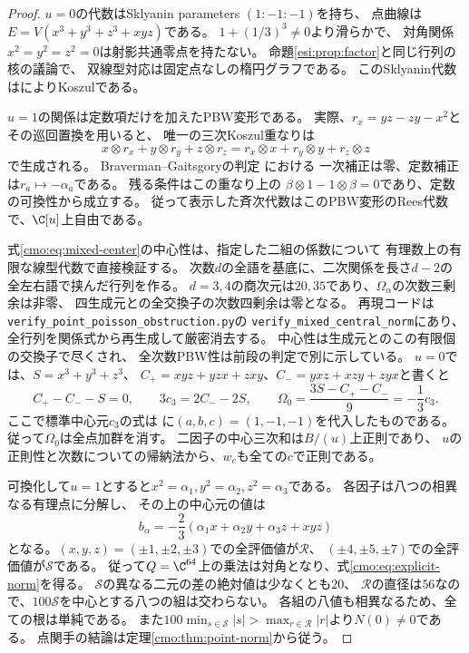 \begin{proof}
$u=0$の代数はSklyanin parameters $(1:-1:-1)$を持ち、
点曲線は$E=V(x^3+y^3+z^3+xyz)$である。
$1+(1/3)^3\ne0$より滑らかで、
対角関係$x^2=y^2=z^2=0$は射影共通零点を持たない。
命題\ref{esi:prop:factor}と同じ行列の核の議論で、
双線型対応は固定点なしの楕円グラフである。
このSklyanin代数は\cite[Theorem~1.1, Corollary~1.3]{GRSklyaninTV}によりKoszulである。

$u=1$の関係は定数項だけを加えたPBW変形である。
実際、$r_x=yz-zy-x^2$とその巡回置換を用いると、
唯一の三次Koszul重なりは
\[
 x\otimes r_x+y\otimes r_y+z\otimes r_z
   =r_x\otimes x+r_y\otimes y+r_z\otimes z
\]
で生成される。
Braverman--Gaitsgoryの判定
\cite[Main Theorem~0.5, Lemma~3.3]{CMOBravermanGaitsgory}における
一次補正は零、定数補正は$r_a\mapsto-\alpha_a$である。
残る条件はこの重なり上の
$\beta\otimes1-1\otimes\beta=0$であり、定数の可換性から成立する。
従って表示した斉次代数はこのPBW変形のRees代数で、$\C[u]$上自由である。

式\eqref{cmo:eq:mixed-center}の中心性は、指定した二組の係数について
有理数上の有限な線型代数で直接検証する。
次数$d$の全語を基底に、二次関係を長さ$d-2$の全左右語で挟んだ行列を作る。
$d=3,4$の商次元は$20,35$であり、$\Omega_\alpha$の次数三剰余は非零、
四生成元との全交換子の次数四剰余は零となる。
再現コードは\texttt{verify\_point\_poisson\_obstruction.py}の
\texttt{verify\_mixed\_central\_norm}にあり、全行列を関係式から再生成して厳密消去する。
中心性は生成元とのこの有限個の交換子で尽くされ、
全次数PBW性は前段の判定で別に示している。
$u=0$では、$S=x^3+y^3+z^3$、
$C_+=xyz+yzx+zxy$、$C_-=yxz+xzy+zyx$と書くと
\[
 C_+-C_--S=0,\qquad 3c_3=2C_--2S,\qquad
 \Omega_0=\frac{3S-C_+-C_-}{9}=-\frac13c_3.
\]
ここで標準中心元$c_3$の式は
\cite[Section~2, p.~3]{GRSklyaninDLL}に$(a,b,c)=(1,-1,-1)$を代入したものである。
従って$\Omega_0$は全点加群を消す。
二因子の中心三次和は$B/(u)$上正則であり、
$u$の正則性と次数についての帰納法から、$w_c$も全ての$c$で正則である。

可換化して$u=1$とすると$x^2=\alpha_1,y^2=\alpha_2,z^2=\alpha_3$である。
各因子は八つの相異なる有理点に分解し、
その上の中心元の値は
\[
 b_\alpha=-\frac23(\alpha_1x+\alpha_2y+\alpha_3z+xyz)
\]
となる。$(x,y,z)=(\pm1,\pm2,\pm3)$での全評価値が$\mathcal R$、
$(\pm4,\pm5,\pm7)$での全評価値が$\mathcal S$である。
従って$Q=\C^{64}$上の乗法は対角となり、式\eqref{cmo:eq:explicit-norm}を得る。
$\mathcal S$の異なる二元の差の絶対値は少なくとも$20$、
$\mathcal R$の直径は$56$なので、$100\mathcal S$を中心とする八つの組は交わらない。
各組の八値も相異なるため、全ての根は単純である。
また$100\min_{s\in\mathcal S}|s|>\max_{r\in\mathcal R}|r|$より$N(0)\ne0$である。
点関手の結論は定理\ref{cmo:thm:point-norm}から従う。
\end{proof}

